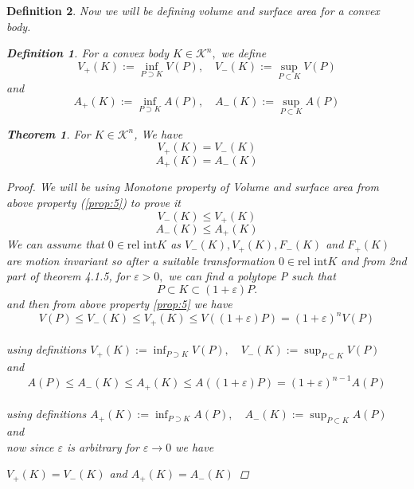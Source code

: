 \documentclass[oneside]{book}
\newtheorem{theorem}{Theorem}[section]
\newtheorem{mydef}{Definition}
\begin{document}
\begin{mydef}
Now we will be defining volume and surface area for a convex body.\\
 \begin{mydef} \label{d:15}
  For a convex body $K \in \mathcal{K}^{n},$ we define
$$ V_{+}(K):=\inf _{P \supset K} V(P), \quad V_{-}(K):=\sup _{P \subset K} V(P)$$ 
and
$$ A_{+}(K):=\inf _{P \supset K} A(P), \quad A_{-}(K):=\sup _{P \subset K} A(P) $$ 
 \end{mydef}
 
\begin{theorem} 	
\label{t:9}
For $K \in \mathcal{K}^{n}$, We have 
\begin{equation}
\label{eq46}
 V_{+}(K)=V_{-}(K)
\end{equation}
   \begin{equation}
   \label{eq47}
   A_{+}(K)=A_{-}(K)
   \end{equation}
\end{theorem}         
\begin{proof}
We will be using Monotone property of Volume and surface area from above property (\ref{prop:5}) to prove it \\
$$V_{-}(K) \leq V_{+}(K)  $$  $$ A_{-}(K) \leq A_{+}(K)$$
We can assume that $0 \in \text{rel int} K$ as  $V_{-}(K), V_{+}(K), F_{-}(K)$ and $F_{+}(K)$ are \newline motion invariant so after a suitable transformation
 $0 \in \text{rel int} K$ 
 and from 2nd part of theorem 4.1.5,
for $\varepsilon>0,$ we can find a polytope P such that 
$$P \subset K \subset(1+\varepsilon) P .$$
\newpage
and then from above property \ref{prop:5} we have \\ 
\[
V(P) \leq V_{-}(K) \leq V_{+}(K) \leq V((1+\varepsilon) P)=(1+\varepsilon)^{n} V(P)
\] \\
using definitions $ V_{+}(K):=\inf _{P \supset K} V(P), \quad V_{-}(K):=\sup _{P \subset K} V(P)$ \\
and   \\
\[
A(P) \leq A_{-}(K) \leq A_{+}(K) \leq A((1+\varepsilon) P)=(1+\varepsilon)^{n-1} A(P)
\]  \\using definitions 
$ A_{+}(K):=\inf _{P \supset K} A(P), \quad A_{-}(K):=\sup _{P \subset K} A(P) $
 and \\ 
 
 now since $\varepsilon $ is arbitrary for $\varepsilon \rightarrow 0$ we have 
 
 $V_{+}(K)=V_{-}(K)$ and  $A_{+}(K)=A_{-}(K)$
 \end{proof}
 

\end{mydef}
\end{document}
